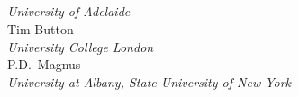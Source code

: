 \begin{titlingpage}

~\\[4cm]
\begin{center}\forallxadl \end{center}
\newpage \thispagestyle{empty} ~\\
\newpage \thispagestyle{empty}
~\\[2cm]
\noindent {}

\vfill


\\
\emph{University of Adelaide}\\[1.5cm]

{Tim Button}\\
\emph{University College London}\\[1.5cm]

{P.D.\ Magnus}\\
\emph{University at Albany, State University of New York}
\end{titlingpage}

\thispagestyle{empty}%

